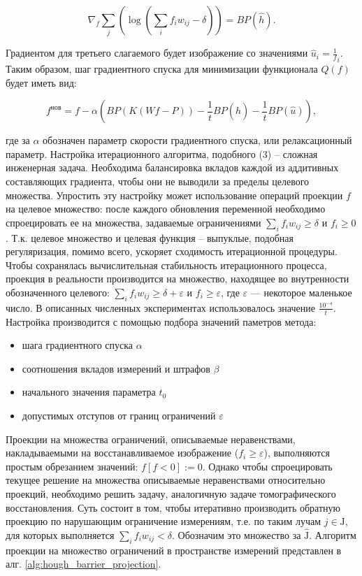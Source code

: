 $$
\nabla_f \sum_j {\left(
  \log{
    \left( \sum_i {f_i w_{ij}} - \delta \right)
  }
\right)} 
= BP(\hat{h}).
$$

Градиентом для третьего слагаемого будет изображение со значениями $\hat{u}_i = \frac 1 f_i$. Таким образом, шаг градиентного спуска для минимизации функционала $Q(f)$ будет иметь вид:

\begin{equation}
  \label{eq:barrier_method_gradstep}
  f^{\text{нов}} = f - \alpha \left(
    BP\left( K(Wf-P) \right) - 
    \frac 1 t BP(\hat{h}) - 
    \frac 1 t BP(\hat{u})
  \right),
\end{equation}

где за $\alpha$ обозначен параметр скорости градиентного спуска, или релаксационный параметр.
Настройка итерационного алгоритма, подобного (3) – сложная инженерная задача.
Необходима балансировка вкладов каждой из аддитивных составляющих градиента, чтобы они не выводили за пределы целевого множества.
Упростить эту настройку может использование операций проекции $f$ на целевое множество: после каждого обновления переменной  необходимо спроецировать ее на множества, задаваемые ограничениями $\sum_i {f_i w_{ij}} \geq \delta$ и $f_i \geq 0$.
Т.к. целевое множество и целевая функция – выпуклые, подобная регуляризация, помимо всего, ускоряет сходимость итерационной процедуры.
Чтобы сохранялась вычислительная стабильность итерационного процесса, проекция в реальности производится на множество, находящее во внутренности обозначенного целевого: $\sum_i {f_i w_{ij}} \geq \delta + \varepsilon$ и $f_i \geq \varepsilon$, где $\varepsilon$ --- некоторое маленькое число.
В описанных численных экспериментах использовалось значение $\frac {10^{-4}}{t}$.
Настройка производится с помощью подбора значений паметров метода:
\begin{itemize}
  \item шага градиентного спуска $\alpha$
  \item соотношения вкладов измерений и штрафов $\beta$
  \item начального значения параметра $t_0$
  \item допустимых отступов от границ ограничений $\varepsilon$
\end{itemize}

Проекции на множества ограничений, описываемые неравенствами, накладываемыми на восстанавливаемое изображение ($f_i \geq \varepsilon$), выполняются простым обрезанием значений: $f[f < 0] := 0$.
Однако чтобы спроецировать текущее решение на множества описываемые неравенствами относительно проекций, необходимо решить задачу, аналогичную задаче томографического восстановления.
Суть состоит в том, чтобы итеративно производить обратную проекцию по нарушающим ограничение измерениям, т.е. по таким лучам $j \in \mathrm J$, для которых выполняется $\sum_i f_i w_{ij} < \delta$.
Обозначим это множество за $\hat{\mathrm J}$.
Алгоритм проекции на множество ограничений в пространстве измерений представлен в алг. \ref{alg:hough_barrier_projection}.

